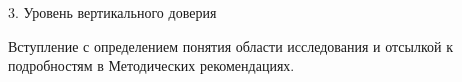 \begin{frame}{3. Уровень вертикального доверия}

Вступление с определением понятия области исследования и отсылкой к подробностям в Методических рекомендациях.

\end{frame}


